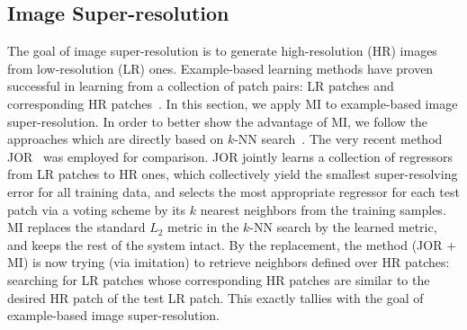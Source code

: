 \subsection{Image Super-resolution}
The goal of image super-resolution is to generate high-resolution (HR) images from
low-resolution (LR) ones. Example-based learning methods have proven
successful in learning from a collection of patch pairs: LR patches
and corresponding HR patches~\citep{Chang-CVPR-2004, Timofte-ICCV-2013,
  Dong-ECCV-2014, JOR:EG15}. In this section, we apply MI to
example-based image super-resolution. In order to better show the
advantage of MI, we follow the approaches which are directly based on $k$-NN
search~\citep{Freeman-CGA-2002, Chang-CVPR-2004, JOR:EG15}. The very
recent method JOR~\citep{JOR:EG15} was employed for comparison. JOR
jointly learns a collection of regressors from LR patches to HR ones,
which collectively yield the smallest super-resolving error for all
training data, and selects the most appropriate regressor for each
test patch via a voting scheme by its $k$ nearest neighbors from the
training samples. MI replaces the standard $L_2$ metric in the $k$-NN
search by the learned metric, and keeps the rest of the system
intact.
By the replacement, the method (JOR + MI) is now trying (via imitation) to
retrieve neighbors defined over HR patches: searching for LR patches
whose corresponding HR patches are similar to the desired HR patch of
the test LR patch.  This exactly tallies with the goal of
example-based image super-resolution.


